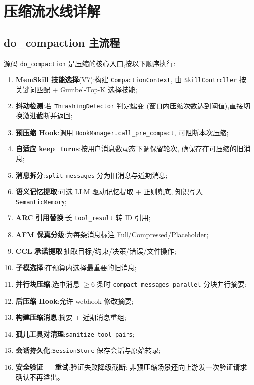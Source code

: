 \documentclass[11pt,a4paper]{article}
\begin{document}
\section{压缩流水线详解}

\subsection{do\_compaction 主流程}

源码 \texttt{do\_compaction} 是压缩的核心入口,按以下顺序执行:

\begin{enumerate}[leftmargin=2em]
  \item \textbf{MemSkill 技能选择}(V7):构建 \texttt{CompactionContext},
        由 \texttt{SkillController} 按关键词匹配 + Gumbel-Top-K 选择技能;
  \item \textbf{抖动检测}:若 \texttt{ThrashingDetector} 判定蠕变
        (窗口内压缩次数达到阈值),直接切换激进截断并返回;
  \item \textbf{预压缩 Hook}:调用 \texttt{HookManager.call\_pre\_compact},
        可阻断本次压缩;
  \item \textbf{自适应 keep\_turns}:按用户消息数动态下调保留轮次,
        确保存在可压缩的旧消息;
  \item \textbf{消息拆分}:\texttt{split\_messages} 分为旧消息与近期消息;
  \item \textbf{语义记忆提取}:可选 LLM 驱动记忆提取 + 正则兜底,
        知识写入 \texttt{SemanticMemory};
  \item \textbf{ARC 引用替换}:长 \texttt{tool\_result} 转 ID 引用;
  \item \textbf{AFM 保真分级}:为每条消息标注 Full/Compressed/Placeholder;
  \item \textbf{CCL 承诺提取}:抽取目标/约束/决策/错误/文件操作;
  \item \textbf{子模选择}:在预算内选择最重要的旧消息;
  \item \textbf{并行块压缩}:选中消息 $\geq 6$ 条时
        \texttt{compact\_messages\_parallel} 分块并行摘要;
  \item \textbf{后压缩 Hook}:允许 webhook 修改摘要;
  \item \textbf{构建压缩消息}:摘要 + 近期消息重组;
  \item \textbf{孤儿工具对清理}:\texttt{sanitize\_tool\_pairs};
  \item \textbf{会话持久化}:\texttt{SessionStore} 保存会话与原始转录;
  \item \textbf{安全验证 + 重试}:验证失败降级截断;
        非预压缩场景还向上游发一次验证请求确认不再溢出。
\end{enumerate}
\end{document}
